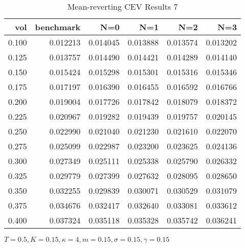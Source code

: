 \begin{table}[ht]
  \centering
  \caption{Mean-reverting CEV Results 7}
  \begin{tabular}{rrrrrr}
  \toprule
    vol &       benchmark &       N=0 &       N=1 &       N=2 &       N=3 \\
  \midrule
  0.100 & 0.012213 & 0.014045 & 0.013888 & 0.013574 & 0.013202 \\
  0.125 & 0.013757 & 0.014490 & 0.014421 & 0.014289 & 0.014140 \\
  0.150 & 0.015424 & 0.015298 & 0.015301 & 0.015316 & 0.015346 \\
  0.175 & 0.017197 & 0.016390 & 0.016455 & 0.016592 & 0.016766 \\
  0.200 & 0.019004 & 0.017726 & 0.017842 & 0.018079 & 0.018372 \\
  0.225 & 0.020967 & 0.019282 & 0.019439 & 0.019757 & 0.020145 \\
  0.250 & 0.022990 & 0.021040 & 0.021230 & 0.021610 & 0.022070 \\
  0.275 & 0.025099 & 0.022987 & 0.023200 & 0.023625 & 0.024136 \\
  0.300 & 0.027349 & 0.025111 & 0.025338 & 0.025790 & 0.026332 \\
  0.325 & 0.029779 & 0.027399 & 0.027632 & 0.028095 & 0.028650 \\
  0.350 & 0.032255 & 0.029839 & 0.030071 & 0.030529 & 0.031079 \\
  0.375 & 0.034676 & 0.032417 & 0.032640 & 0.033081 & 0.033612 \\
  0.400 & 0.037324 & 0.035118 & 0.035328 & 0.035742 & 0.036241 \\
  \bottomrule
  \end{tabular}
  \small{$T=0.5,K=0.15, \kappa = 4,m=0.15, \sigma = 0.15, \gamma = 0.15$}
\end{table}


